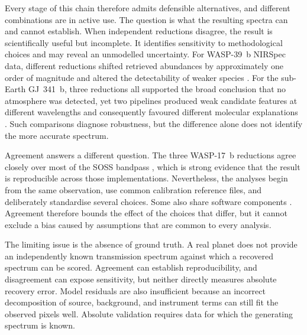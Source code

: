 Every stage of this chain therefore admits defensible alternatives, and
different combinations are in active use. The question is what the resulting
spectra can and cannot establish. When independent reductions disagree, the
result is scientifically useful but incomplete. It identifies sensitivity to
methodological choices and may reveal an unmodelled uncertainty. For
WASP-39~b NIRSpec data, different reductions shifted retrieved abundances by
approximately one order of magnitude and altered the detectability of weaker
species \citep{ConstantinouEtAl2023}. For the sub-Earth
GJ~341~b, three reductions all supported the broad conclusion that no atmosphere
was detected, yet two pipelines produced weak candidate features at different
wavelengths and consequently favoured different molecular explanations
\citep{KirkEtAl2024}. Such comparisons diagnose robustness, but the difference
alone does not identify the more accurate spectrum.


Agreement answers a different question. The three WASP-17~b reductions agree
closely over most of the SOSS bandpass \citep{LouieEtAl2025}, which is strong
evidence that the result is reproducible across those implementations.
Nevertheless, the analyses begin from the same observation, use common
calibration reference files, and deliberately standardise several choices.
Some also share software components
\citep{BellEtAl2022,RadicaEtAl2023,LouieEtAl2025}. Agreement therefore bounds the effect of
the choices that differ, but it cannot exclude a bias caused by assumptions that
are common to every analysis.


The limiting issue is the absence of ground truth. A real planet does not
provide an independently known transmission spectrum against which a recovered
spectrum can be scored. Agreement can establish reproducibility, and
disagreement can expose sensitivity, but neither directly measures absolute
recovery error. Model residuals are also insufficient because an incorrect
decomposition of source, background, and instrument terms can still fit the
observed pixels well. Absolute validation requires data for which the generating
spectrum is known.

